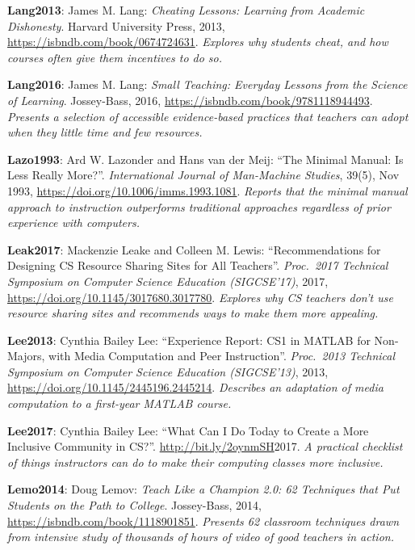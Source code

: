 \textbf{\hypertarget{b:Lang2013}{Lang2013}\label{b:Lang2013}}: James M. Lang: \emph{Cheating Lessons: Learning from Academic Dishonesty}. Harvard University Press, 2013, \url{https://isbndb.com/book/0674724631}. \emph{Explores why students cheat, and how courses often give them incentives to do so.}

\textbf{\hypertarget{b:Lang2016}{Lang2016}\label{b:Lang2016}}: James M. Lang: \emph{Small Teaching: Everyday Lessons from the Science of Learning}. Jossey-Bass, 2016, \url{https://isbndb.com/book/9781118944493}. \emph{Presents a selection of accessible evidence-based practices that teachers can adopt when they little time and few resources.}

\textbf{\hypertarget{b:Lazo1993}{Lazo1993}\label{b:Lazo1993}}: Ard W. Lazonder and Hans van der Meij: ``The Minimal Manual: Is Less Really More?''. \emph{International Journal of Man-Machine Studies}, 39(5), Nov 1993, \url{https://doi.org/10.1006/imms.1993.1081}. \emph{Reports that the minimal manual approach to instruction outperforms traditional approaches regardless of prior experience with computers.}

\textbf{\hypertarget{b:Leak2017}{Leak2017}\label{b:Leak2017}}: Mackenzie Leake and Colleen M. Lewis: ``Recommendations for Designing CS Resource Sharing Sites for All Teachers''. \emph{Proc.\ 2017 Technical Symposium on Computer Science Education (SIGCSE'17)}, 2017, \url{https://doi.org/10.1145/3017680.3017780}. \emph{Explores why CS teachers don't use resource sharing sites and recommends ways to make them more appealing.}

\textbf{\hypertarget{b:Lee2013}{Lee2013}\label{b:Lee2013}}: Cynthia Bailey Lee: ``Experience Report: CS1 in MATLAB for Non-Majors, with Media Computation and Peer Instruction''. \emph{Proc.\ 2013 Technical Symposium on Computer Science Education (SIGCSE'13)}, 2013, \url{https://doi.org/10.1145/2445196.2445214}. \emph{Describes an adaptation of media computation to a first-year MATLAB course.}

\textbf{\hypertarget{b:Lee2017}{Lee2017}\label{b:Lee2017}}: Cynthia Bailey Lee: ``What Can I Do Today to Create a More Inclusive Community in CS?''. \url{http://bit.ly/2oynmSH}2017. \emph{A practical checklist of things instructors can do to make their computing classes more inclusive.}

\textbf{\hypertarget{b:Lemo2014}{Lemo2014}\label{b:Lemo2014}}: Doug Lemov: \emph{Teach Like a Champion 2.0: 62 Techniques that Put Students on the Path to College}. Jossey-Bass, 2014, \url{https://isbndb.com/book/1118901851}. \emph{Presents 62 classroom techniques drawn from intensive study of thousands of hours of video of good teachers in action.}

